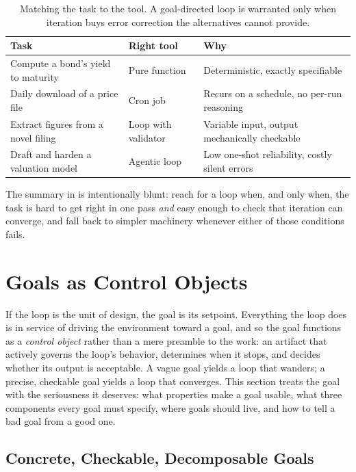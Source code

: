 \begin{table}[t]
\centering
\begin{tabularx}{\linewidth}{@{}X l X@{}}
\toprule
\textbf{Task} & \textbf{Right tool} & \textbf{Why} \\
\midrule
Compute a bond's yield to maturity & Pure function & Deterministic, exactly specifiable \\
Daily download of a price file & Cron job & Recurs on a schedule, no per-run reasoning \\
Extract figures from a novel filing & Loop with validator & Variable input, output mechanically checkable \\
Draft and harden a valuation model & Agentic loop & Low one-shot reliability, costly silent errors \\
\bottomrule
\end{tabularx}
\caption{Matching the task to the tool. A goal-directed loop is warranted only when iteration buys error correction the alternatives cannot provide.}
\label{tab:when-to-loop}
\end{table}

The summary in  is intentionally blunt: reach for a loop when, and only when, the task is hard to get right in one pass \emph{and} easy enough to check that iteration can converge, and fall back to simpler machinery whenever either of those conditions fails.

\section{Goals as Control Objects}\label{sec:goals-as-control}

If the loop is the unit of design, the goal is its setpoint. Everything the loop does is in service of driving the environment toward a goal, and so the goal functions as a \emph{control object} rather than a mere preamble to the work: an artifact that actively governs the loop's behavior, determines when it stops, and decides whether its output is acceptable. A vague goal yields a loop that wanders; a precise, checkable goal yields a loop that converges. This section treats the goal with the seriousness it deserves: what properties make a goal usable, what three components every goal must specify, where goals should live, and how to tell a bad goal from a good one.

\subsection{Concrete, Checkable, Decomposable Goals}\label{subsec:concrete-checkable-goals}

